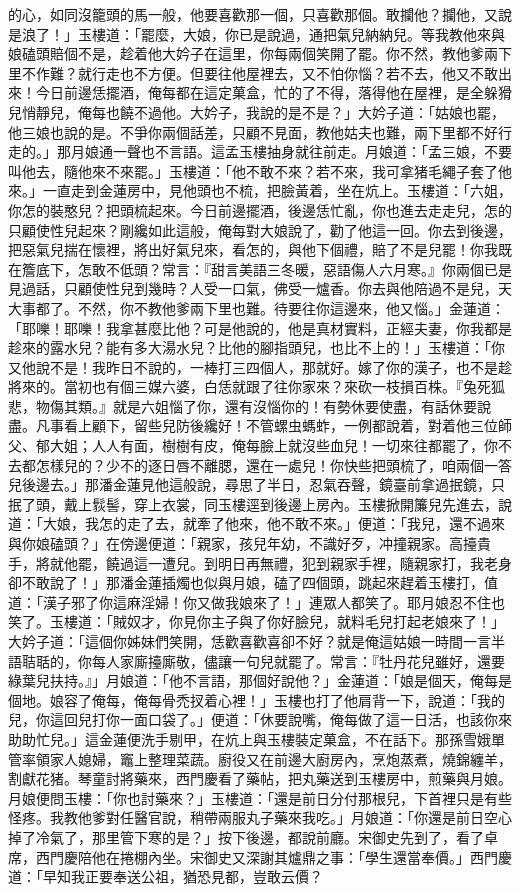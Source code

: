 的心，如同沒籠頭的馬一般，他要喜歡那一個，只喜歡那個。敢攔他？攔他，又說是浪了！」玉樓道：「罷麼，大娘，你已是說過，通把氣兒納納兒。等我教他來與娘磕頭賠個不是，趁着他大妗子在這里，你每兩個笑開了罷。你不然，教他爹兩下里不作難？就行走也不方便。但要往他屋裡去，又不怕你惱？若不去，他又不敢出來！今日前邊恁擺酒，俺每都在這定菓盒，忙的了不得，落得他在屋裡，是全躲猾兒悄靜兒，俺每也饒不過他。大妗子，我說的是不是？」大妗子道：「姑娘也罷，他三娘也說的是。不爭你兩個話差，只顧不見面，教他姑夫也難，兩下里都不好行走的。」那月娘通一聲也不言語。這孟玉樓抽身就往前走。月娘道：「孟三娘，不要叫他去，隨他來不來罷。」玉樓道：「他不敢不來？若不來，我可拿猪毛繩子套了他來。」一直走到金蓮房中，見他頭也不梳，把臉黃着，坐在炕上。玉樓道：「六姐，你怎的裝憨兒？把頭梳起來。今日前邊擺酒，後邊恁忙亂，你也進去走走兒，怎的只顧使性兒起來？剛纔如此這般，俺每對大娘說了，勸了他這一回。你去到後邊，把惡氣兒揣在懷裡，將出好氣兒來，看怎的，與他下個禮，賠了不是兒罷！你我既在簷底下，怎敢不低頭？常言：『甜言美語三冬暖，惡語傷人六月寒。』你兩個已是見過話，只顧使性兒到幾時？人受一口氣，佛受一爐香。你去與他陪過不是兒，天大事都了。不然，你不教他爹兩下里也難。待要往你這邊來，他又惱。」金蓮道：「耶嚛！耶嚛！我拿甚麼比他？可是他說的，他是真材實料，正經夫妻，你我都是趁來的露水兒？能有多大湯水兒？比他的腳指頭兒，也比不上的！」玉樓道：「你又他說不是！我昨日不說的，一棒打三四個人，那就好。嫁了你的漢子，也不是趁將來的。當初也有個三媒六婆，白恁就跟了往你家來？來砍一枝損百株。『兔死狐悲，物傷其類。』就是六姐惱了你，還有沒惱你的！有勢休要使盡，有話休要說盡。凡事看上顧下，留些兒防後纔好！不管螺虫螞蚱，一例都說着，對着他三位師父、郁大姐；人人有面，樹樹有皮，俺每臉上就沒些血兒！一切來往都罷了，你不去都怎樣兒的？少不的逐日唇不離腮，還在一處兒！你快些把頭梳了，咱兩個一答兒後邊去。」那潘金蓮見他這般說，尋思了半日，忍氣吞聲，鏡臺前拿過抿鏡，只抿了頭，戴上䯼髻，穿上衣裳，同玉樓逕到後邊上房內。玉樓掀開簾兒先進去，說道：「大娘，我怎的走了去，就牽了他來，他不敢不來。」便道：「我兒，還不過來與你娘磕頭？」在傍邊便道：「親家，孩兒年幼，不識好歹，冲撞親家。高擡貴手，將就他罷，饒過這一遭兒。到明日再無禮，犯到親家手裡，隨親家打，我老身卻不敢說了！」那潘金蓮插燭也似與月娘，磕了四個頭，跳起來趕着玉樓打，值道：「漢子邪了你這麻淫婦！你又做我娘來了！」連眾人都笑了。耶月娘忍不住也笑了。玉樓道：「賊奴才，你見你主子與了你好臉兒，就料毛兒打起老娘來了！」大妗子道：「這個你姊妹們笑開，恁歡喜歡喜卻不好？就是俺這姑娘一時間一言半語聐聒的，你每人家廝擡廝敬，儘讓一句兒就罷了。常言：『牡丹花兒雖好，還要綠葉兒扶持。』」月娘道：「他不言語，那個好說他？」金蓮道：「娘是個天，俺每是個地。娘容了俺每，俺每骨禿扠着心裡！」玉樓也打了他肩背一下，說道：「我的兒，你這回兒打你一面口袋了。」便道：「休要說嘴，俺每做了這一日活，也該你來助助忙兒。」這金蓮便洗手剔甲，在炕上與玉樓裝定菓盒，不在話下。那孫雪娥單管率領家人媳婦，竈上整理菜蔬。廚役又在前邊大廚房內，烹炮蒸煮，燒錦纏羊，割獻花猪。琴童討將藥來，西門慶看了藥帖，把丸藥送到玉樓房中，煎藥與月娘。月娘便問玉樓：「你也討藥來？」玉樓道：「還是前日分付那根兒，下首裡只是有些怪疼。我教他爹對任醫官說，稍帶兩服丸子藥來我吃。」月娘道：「你還是前日空心掉了冷氣了，那里管下寒的是？」按下後邊，都說前廳。宋御史先到了，看了卓席，西門慶陪他在捲棚內坐。宋御史又深謝其爐鼎之事：「學生還當奉價。」西門慶道：「早知我正要奉送公祖，猶恐見都，豈敢云價？